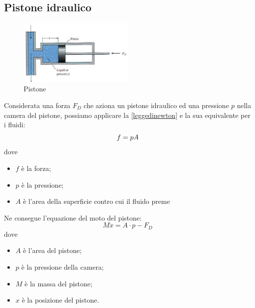 \documentclass[a4paper]{report}
\begin{document}
\subsection{Pistone idraulico}
\begin{figure}[!h]
\centering
\includegraphics[width=0.5\textwidth]{./images/pistone.png}
\caption{Pistone\label{fig:pistone}}
\end{figure}
Considerata una forza $F_D$ che aziona un pistone idraulico ed una
pressione $p$ nella camera del pistone, possiamo applicare la
\ref{leggedinewton} e la sua equivalente per i fluidi:
\begin{equation}\label{eq:newton-fluidi}\index{Legge di Newton per i fluidi}
  f = p A
\end{equation}
dove
\begin{itemize}
\item $f$ \`e la forza;
\item $p$ \`e la pressione;
\item $A$ \`e l'area della superficie contro cui il fluido preme
\end{itemize}
Ne consegue l'equazione del moto del pistone:
\begin{equation}\label{eq:pistone}
  M\ddot{x} = A \cdot p - F_D
\end{equation}
dove
\begin{itemize}
\item $A$ \`e l'area del pistone;
\item $p$ \`e la pressione della camera;
\item $M$ \`e la massa del pistone;
\item $x$ \`e la posizione del pistone.
\end{itemize}
\end{document}
